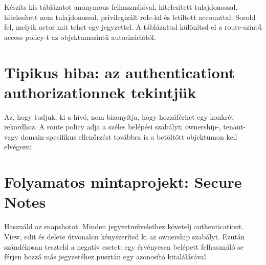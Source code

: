Készíts kis táblázatot anonymous felhasználóval, hitelesített tulajdonossal, hitelesített nem tulajdonossal, privilegizált role-lal és letiltott accounttal. Sorold fel, melyik actor mit tehet egy jegyzettel. A táblázattal különítsd el a route-szintű access policy-t az objektumszintű autorizációtól.

\section{Tipikus hiba: az authenticationt authorizationnek tekintjük}
Az, hogy tudjuk, ki a hívó, nem bizonyítja, hogy hozzáférhet egy konkrét rekordhoz. A route policy adja a széles belépési szabályt; ownership-, tenant- vagy domain-specifikus ellenőrzést továbbra is a betöltött objektumon kell elvégezni.

\section{Folyamatos mintaprojekt: Secure Notes}
Használd az  snapshotot. Minden jegyzetművelethez követelj authenticationt. View, edit és delete útvonalon kényszerítsd ki az ownership szabályt. Ezután szándékosan teszteld a negatív esetet: egy érvényesen belépett felhasználó se férjen hozzá más jegyzetéhez pusztán egy azonosító kitalálásával.
